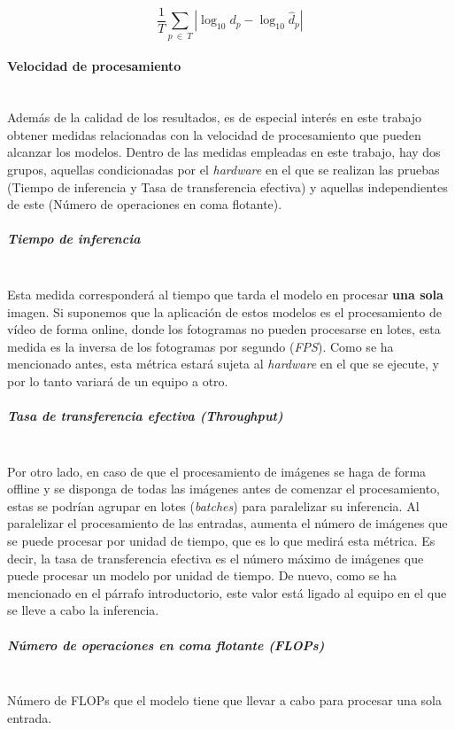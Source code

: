 \begin{equation}
\label{eqn:log10}
\frac{1}{T} \sum_{p\ \in\ T} |\log_{10}{d_p} - \log_{10}{\hat{d}_p}|
\end{equation}

\paragraph{Velocidad de procesamiento}\mbox{}\\
Además de la calidad de los resultados, es de especial interés en este trabajo obtener medidas relacionadas con la velocidad de procesamiento que pueden alcanzar los modelos. Dentro de las medidas empleadas en este trabajo, hay dos grupos, aquellas condicionadas por el \textit{hardware} en el que se realizan las pruebas (Tiempo de inferencia y Tasa de transferencia efectiva) y aquellas independientes de este (Número de operaciones en coma flotante).

\subparagraph{Tiempo de inferencia}\mbox{}\\
Esta medida corresponderá al tiempo que tarda el modelo en procesar \textbf{una sola} imagen. Si suponemos que la aplicación de estos modelos es el procesamiento de vídeo de forma online, donde los fotogramas no pueden procesarse en lotes, esta medida es la inversa de los fotogramas por segundo (\textit{FPS}). 
Como se ha mencionado antes, esta métrica estará sujeta al \textit{hardware} en el que se ejecute, y por lo tanto variará de un equipo a otro.

\subparagraph{Tasa de transferencia efectiva \textit{(Throughput)}}\mbox{}\\
Por otro lado, en caso de que el procesamiento de imágenes se haga de forma offline y se disponga de todas las imágenes antes de comenzar el procesamiento, estas se podrían agrupar en lotes (\textit{batches}) para paralelizar su inferencia. Al paralelizar el procesamiento de las entradas, aumenta el número de imágenes que se puede procesar por unidad de tiempo, que es lo que medirá esta métrica. Es decir, la tasa de transferencia efectiva es el número máximo de imágenes que puede procesar un modelo por unidad de tiempo.
De nuevo, como se ha mencionado en el párrafo introductorio, este valor está ligado al equipo en el que se lleve a cabo la inferencia.

\subparagraph{Número de operaciones en coma flotante \textit{(FLOPs)}}\mbox{}\\
Número de FLOPs que el modelo tiene que llevar a cabo para procesar una sola entrada.

